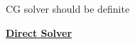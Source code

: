 \documentclass[landscape,a0paper,fontscale=0.285]{baposter} %
\newcommand{\compresslist}{ %
\setlength{\itemsep}{1pt}
\setlength{\parskip}{0pt}
\setlength{\parsep}{0pt}
}
\begin{document}
\begin{poster}
{CG solver should be definite








\underline{\textbf{Direct Solver}}

}
\end{poster}
\end{document}

